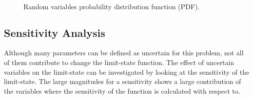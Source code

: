 \documentclass[paper=a4, fontsize=12pt]{scrartcl} %
\begin{document}
\begin{figure}[H]
{		\label{fig:results_fft}
		}
		\quad
		\\
		\quad
		\caption{Random variables probability distribution function (PDF).}
		\label{fig:random_variables_pdf}
	\end{figure}
%
\subsection{Sensitivity Analysis}
Although many parameters can be defined as uncertain for this problem, not all of them contribute to change the limit-state function. The effect of uncertain variables on the limit-state can be investigated by looking at the sensitivity of the limit-state. The large magnitudes for a sensitivity shows a large contribution of the variables where the sensitivity of the function is calculated with respect to.\\
\end{document}

